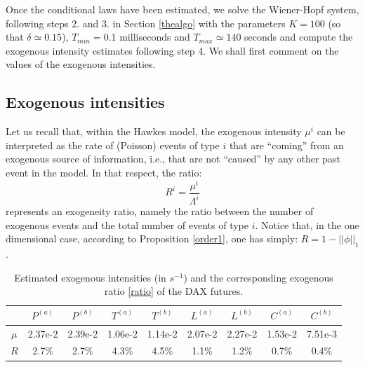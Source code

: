 \documentclass[a4paper,11pt]{article}
\newcommand{\PA}{P^{(a)}}
\newcommand{\PB}{P^{(b)}}
\newcommand{\TA}{T^{(a)}}
\newcommand{\TB}{T^{(b)}}
\newcommand{\CA}{C^{(a)}}
\newcommand{\CB}{C^{(b)}}
\newcommand{\LA}{L^{(a)}}
\newcommand{\LB}{L^{(b)}}
\begin{document}
\noindent Once the conditional laws have been estimated, we solve the Wiener-Hopf system, following
steps 2. and 3. in Section \ref{thealgo} with the parameters $K=100$ (so that $\delta\simeq 0.15$), $T_{min}=0.1$ milliseconds and $T_{max}\simeq 140$ seconds and compute the exogenous intensity estimates following step 4.
We shall first comment on the values of the exogenous intensities.


\subsection{Exogenous intensities}
Let us recall that, within the Hawkes model, the exogenous intensity $\mu^i$
can be interpreted as the rate of (Poisson) events of type $i$ that are ``coming'' from an exogenous source of information, i.e., that are not ``caused'' by any other past event in the model. In that respect, the ratio:
\begin{equation}
\label{ratio}
R^i = \frac{\mu^i}{\Lambda^i}
\end{equation}
represents an exogeneity ratio, namely the ratio between the number of exogenous
events and the total number of events of type $i$.
Notice that, in the one dimensional case, according to Proposition \ref{order1}, one has simply:
$R = 1-||\phi||_1$.


\begin{table}[H]
\begin{center}
\begin{tabular}{|c|c|c|c|c|c|c|c|c|}
\hline
&$\PA$&$\PB$&$\TA$&$\TB$&$\LA$&$\LB$&$\CA$&$\CB$\\
\hline
$\mu$ &2.37e-2 & 2.39e-2 & 1.06e-2 & 1.14e-2 & 2.07e-2 & 2.27e-2 & 1.53e-2 & 7.51e-3 \\
\hline
$R $&2.7\% & 2.7\% & 4.3\% & 4.5\% & 1.1\% & 1.2\% & 0.7\% & 0.4\% \\
\hline
\end{tabular}
\end{center}
\caption{Estimated exogenous intensities (in $s^{-1}$) and the corresponding exogenous ratio \eqref{ratio} of the DAX futures.}
\label{tt1}
\end{table}
\end{document}
